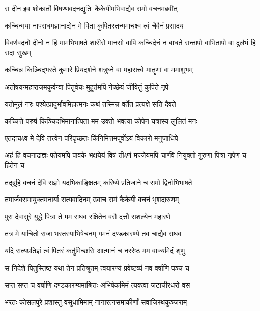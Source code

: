 \twolineshloka
{स दीन इव शोकार्तो विषण्णवदनद्युतिः}
{कैकेयीमभिवाद्यैव रामो वचनमब्रवीत्} %

\twolineshloka
{कच्चिन्मया नापराधमज्ञानाद्येन मे पिता}
{कुपितस्तन्ममाचक्ष्व त्वं चैवैनं प्रसादय} %

\threelineshloka
{विवर्णवदनो दीनो न हि मामभिभाषते}
{शारीरो मानसो वापि कच्चिदेनं न बाधते}
{सन्तापो वाभितापो वा दुर्लभं हि सदा सुखम्} %

\twolineshloka
{कच्चिन्न किञ्चिद्भरते कुमारे प्रियदर्शने}
{शत्रुघ्ने वा महासत्त्वे मातॄणां वा ममाशुभम्} %

\twolineshloka
{अतोषयन्महाराजमकुर्वन्वा पितुर्वचः}
{मुहूर्तमपि नेच्छेयं जीवितुं कुपिते नृपे} %

\twolineshloka
{यतोमूलं नरः पश्येत्प्रादुर्भावमिहात्मनः}
{कथं तस्मिन्न वर्तेत प्रत्यक्षे सति दैवते} %

\twolineshloka
{कच्चित्ते परुषं किञ्चिदभिमानात्पिता मम}
{उक्तो भवत्या कोपेन यत्रास्य लुलितं मनः} %

\twolineshloka
{एतदाचक्ष्व मे देवि तत्त्वेन परिपृच्छतः}
{किंनिमित्तमपूर्वोऽयं विकारो मनुजाधिपे} %

\threelineshloka
{अहं हि वचनाद्राज्ञः पतेयमपि पावके}
{भक्षयेयं विषं तीक्ष्णं मज्जेयमपि चार्णवे}
{नियुक्तो गुरुणा पित्रा नृपेण च हितेन च} %

\twolineshloka
{तद्ब्रूहि वचनं देवि राज्ञो यदभिकाङ्क्षितम्}
{करिष्ये प्रतिजाने च रामो द्विर्नाभिभाषते} %

\twolineshloka
{तमार्जवसमायुक्तमनार्या सत्यवादिनम्}
{उवाच रामं कैकेयी वचनं भृशदारुणम्} %

\twolineshloka
{पुरा देवासुरे युद्धे पित्रा ते मम राघव}
{रक्षितेन वरौ दत्तौ सशल्येन महारणे} %

\twolineshloka
{तत्र मे याचितो राजा भरतस्याभिषेचनम्}
{गमनं दण्डकारण्ये तव चाद्यैव राघव} %

\twolineshloka
{यदि सत्यप्रतिज्ञं त्वं पितरं कर्तुमिच्छसि}
{आत्मानं च नररेष्ठ मम वाक्यमिदं शृणु} %

\twolineshloka
{स निदेशे पितुस्तिष्ठ यथा तेन प्रतिश्रुतम्}
{त्वयारण्यं प्रवेष्टव्यं नव वर्षाणि पञ्च च} %

\twolineshloka
{सप्त सप्त च वर्षाणि दण्डकारण्यमाश्रितः}
{अभिषेकमिमं त्यक्त्वा जटाचीरधरो वस} %

\twolineshloka
{भरतः कोसलपुरे प्रशास्तु वसुधामिमाम्}
{नानारत्नसमाकीर्णां सवाजिरथकुञ्जराम्} %

